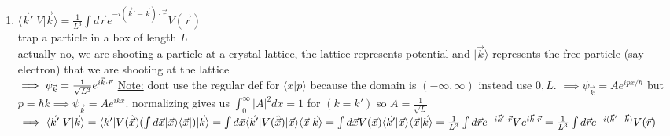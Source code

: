 \documentclass[12pt]{amsart}
\begin{document}
\begin{enumerate}
\item \underline{$\langle \vec{k}' | V | \vec{k} \rangle = \frac{1}{L^3} \int d \vec{r} e^{- i( \vec{k}' - \vec{k}) \cdot \vec{r}} V(\vec{r})$}\\
trap a particle in a box of length $L$\\
actually no, we are shooting a particle at a crystal lattice, the lattice represents potential and $|\vec{k} \rangle $ represents the free particle (say electron) that we are shooting at the lattice\\
$\implies \psi_{\vec{k}} = \frac{1}{\sqrt{L^3}} e^{i \vec{k} \cdot \vec{r}}\\$
\underline{Note:} dont use the regular def for $\langle x | p \rangle$ because the domain is $(-\infty,\infty)$ instead use $0, L$. $\implies \psi_{\vec{k}}= A e^{i p x/\hbar}$ but $p = \hbar k \implies \psi_{\vec{k}} = A e^{i k x}$. normalizing gives us $\int_0^{\infty} |A|^2 dx=1$ for $(k=k')$ so $A= \frac{1}{\sqrt{L}}$
$\implies \langle \vec{k}' | V | \vec{k} \rangle = \langle \vec{k}' | V(\hat{\vec{x}}) ( \int d \vec{x} | \vec{x} \rangle \langle \vec{x} | ) | \vec{k} \rangle\\
= \int d \vec{x} \langle \vec{k}' | V ( \hat{\vec{x}})| \vec{x} \rangle \langle \vec{x} | \vec{k} \rangle\\
= \int d \vec{x} V( \vec{x}) \langle \vec{k}' | \vec{x} \rangle \langle \vec{x} | \vec{k} \rangle = \frac{1}{L^3} \int d \vec{r} e^{- i \vec{k}' \cdot \vec{r}} V e^{i \vec{k} \cdot \vec{r}}\\
= \frac{1}{L^3} \int d \vec{r} e^{-i( \vec{k}' - \vec{k})} V(\vec{r})$


\hdashrule[0.5ex][c]{\linewidth}{0.5pt}{1.5mm}



\end{enumerate}
\end{document}
